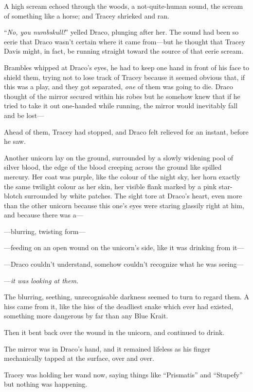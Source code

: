 A high scream echoed through the woods, a not-quite-human sound, the scream of something like a horse; and Tracey shrieked and ran.

“\emph{No, you numbskull!}” yelled Draco, plunging after her. The sound had been so eerie that Draco wasn’t certain where it came from—but he thought that Tracey Davis might, in fact, be running straight toward the source of that eerie scream.

Brambles whipped at Draco’s eyes, he had to keep one hand in front of his face to shield them, trying not to lose track of Tracey because it seemed obvious that, if this was a play, and they got separated, \emph{one} of them was going to die. Draco thought of the mirror secured within his robes but he somehow knew that if he tried to take it out one-handed while running, the mirror would inevitably fall and be lost—

Ahead of them, Tracey had stopped, and Draco felt relieved for an instant, before he saw.

Another unicorn lay on the ground, surrounded by a slowly widening pool of silver blood, the edge of the blood creeping across the ground like spilled mercury. Her coat was purple, like the colour of the night sky, her horn exactly the same twilight colour as her skin, her visible flank marked by a pink star-blotch surrounded by white patches. The sight tore at Draco’s heart, even more than the other unicorn because this one’s eyes were staring glassily right at him, and because there was a—

—blurring, twisting form—

—feeding on an open wound on the unicorn’s side, like it was drinking from it—

—Draco couldn’t understand, somehow couldn’t recognize what he was seeing—

—\emph{it was looking at them.}

The blurring, seething, unrecognisable darkness seemed to turn to regard them. A hiss came from it, like the hiss of the deadliest snake which ever had existed, something more dangerous by far than any Blue Krait.

Then it bent back over the wound in the unicorn, and continued to drink.

The mirror was in Draco’s hand, and it remained lifeless as his finger mechanically tapped at the surface, over and over.

Tracey was holding her wand now, saying things like “Prismatis” and “Stupefy” but nothing was happening.

